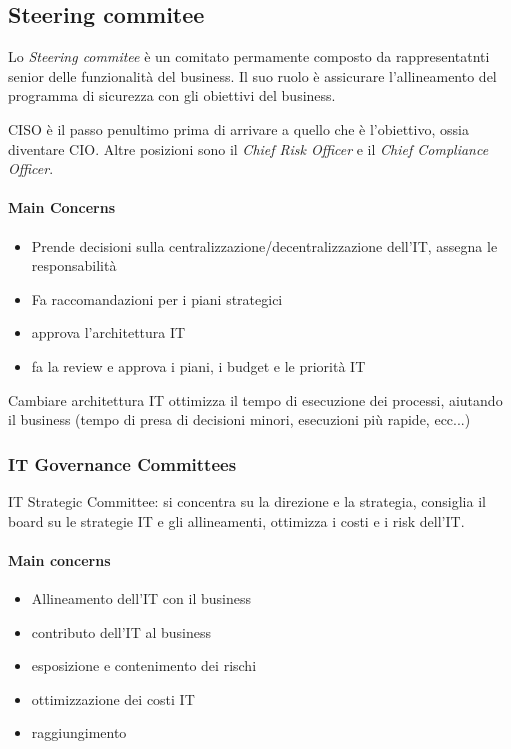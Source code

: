 \subsection{Steering commitee}
Lo \textit{Steering commitee} è un comitato permamente composto da 
rappresentatnti senior delle funzionalità del business. Il suo ruolo è 
assicurare l'allineamento del programma di sicurezza con gli obiettivi del 
business.

CISO è il passo penultimo prima di arrivare a quello che è l'obiettivo, ossia 
diventare CIO. Altre posizioni sono il \textit{Chief Risk Officer} e il 
\textit{Chief Compliance Officer}.

\paragraph*{Main Concerns}

\begin{itemize}
\item Prende decisioni sulla centralizzazione/decentralizzazione dell'IT, 
assegna le responsabilità
\item Fa raccomandazioni per i piani strategici
\item approva l'architettura IT
\item fa la review e approva i piani, i budget e le priorità IT
\end{itemize}

Cambiare architettura IT ottimizza il tempo di esecuzione dei processi, aiutando 
il business (tempo di presa di decisioni minori, esecuzioni più rapide, ecc...)

\subsubsection{IT Governance Committees}
IT Strategic Committee: si concentra su la direzione e la strategia, consiglia 
il board su le strategie IT e gli allineamenti, ottimizza i costi e i risk 
dell'IT.

\paragraph{Main concerns}

\begin{itemize}
\item Allineamento dell'IT con il business
\item contributo dell'IT al business
\item esposizione e contenimento dei rischi
\item ottimizzazione dei costi IT
\item raggiungimento 
\end{itemize}



